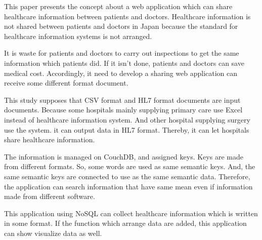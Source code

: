 This paper presents the concept about a web application
which can share healthcare information between patients and doctors.
Healthcare information is not shared between patients and doctors
in Japan
because the standard for healthcare information systems
is not arranged.

It is waste for patients and doctors to carry out inspections
to get  the same information which patients did.
If it isn't done, patients and doctors can save medical cost.
Accordingly, it need to develop a sharing web application can receive some different format document.

This study supposes that CSV format and HL7 format documents
are input documents.
Because some hospitals mainly supplying
primary care use Excel instead of healthcare information system.
And other hospital supplying surgery use the system.
it can output data in HL7 format.
Thereby, it can let hospitals share healthcare information.

The information is managed on CouchDB,
and assigned keys.
Keys are made from different formats.
So, some words are used as same semantic keys.
And, the same semantic keys are connected
to use as the same semantic data.
Therefore, the application can search information
that have same mean even if information made from different software.

This application using NoSQL can collect healthcare information
which is written in some format.
If the function which arrange data are added,
this application can show visualize data as well.
